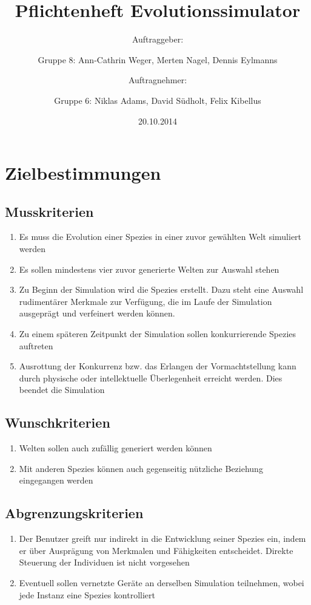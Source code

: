 \documentclass[a4paper, 10pt]{article}
\title{Pflichtenheft Evolutionssimulator}
\author{Auftraggeber: \and
Gruppe 8: Ann-Cathrin Weger, Merten Nagel, Dennis Eylmanns \and
Auftragnehmer: \and
Gruppe 6: Niklas Adams, David Südholt, Felix Kibellus}
\date{20.10.2014}
\begin{document}
	\maketitle

\section{Zielbestimmungen}
\subsection{Musskriterien}
\begin{enumerate}
\item
Es muss die Evolution einer Spezies in einer zuvor gewählten Welt simuliert werden
\item
Es sollen mindestens vier zuvor generierte Welten zur Auswahl stehen
\item
Zu Beginn der Simulation wird die Spezies erstellt. Dazu steht eine Auswahl rudimentärer Merkmale zur Verfügung, die im Laufe der Simulation ausgeprägt und verfeinert werden können.
\item
Zu einem späteren Zeitpunkt der Simulation sollen konkurrierende Spezies auftreten
\item
Ausrottung der Konkurrenz bzw. das Erlangen der Vormachtstellung kann durch physische oder intellektuelle Überlegenheit erreicht werden. Dies beendet die Simulation
\end{enumerate}

\subsection{Wunschkriterien}
\begin{enumerate}
\item
Welten sollen auch zufällig generiert werden können
\item
Mit anderen Spezies können auch gegenseitig nützliche Beziehung eingegangen werden
\end{enumerate} 

\subsection{Abgrenzungskriterien}
\begin{enumerate}
\item
Der Benutzer greift nur indirekt in die Entwicklung seiner Spezies ein, indem er über Ausprägung von Merkmalen und Fähigkeiten entscheidet. Direkte Steuerung der Individuen ist nicht vorgesehen
\item
Eventuell sollen vernetzte Geräte an derselben Simulation teilnehmen, wobei jede Instanz eine Spezies kontrolliert
\end{enumerate}
\end{document}
